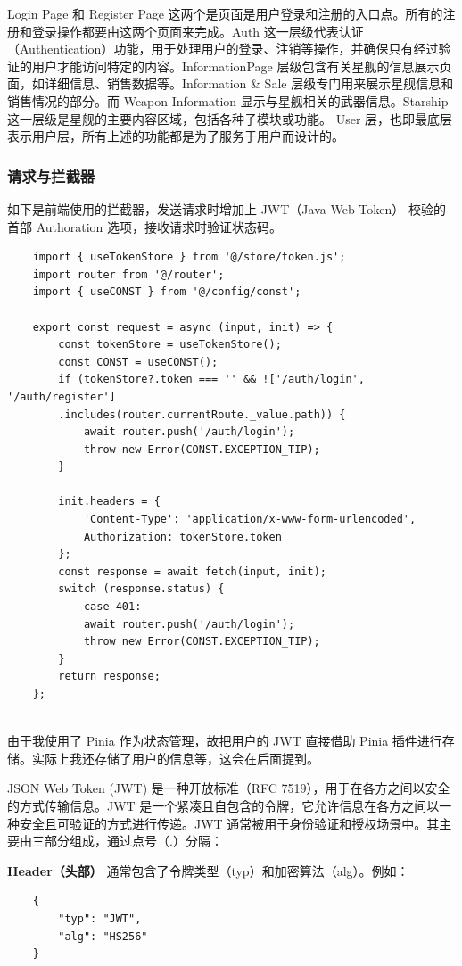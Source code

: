 \documentclass{base}
\begin{document}
Login Page 和 Register Page 这两个是页面是用户登录和注册的入口点。所有的注册和登录操作都要由这两个页面来完成。Auth 这一层级代表认证（Authentication）功能，用于处理用户的登录、注销等操作，并确保只有经过验证的用户才能访问特定的内容。InformationPage 层级包含有关星舰的信息展示页面，如详细信息、销售数据等。Information \& Sale 层级专门用来展示星舰信息和销售情况的部分。而 Weapon Information 显示与星舰相关的武器信息。Starship 这一层级是星舰的主要内容区域，包括各种子模块或功能。
User 层，也即最底层表示用户层，所有上述的功能都是为了服务于用户而设计的。

\subsubsection{请求与拦截器}

如下是前端使用的拦截器，发送请求时增加上 JWT（Java Web Token） 校验的首部 Authoration 选项，接收请求时验证状态码。

\begin{verbatim}
	import { useTokenStore } from '@/store/token.js';
	import router from '@/router';
	import { useCONST } from '@/config/const';
	
	export const request = async (input, init) => {
		const tokenStore = useTokenStore();
		const CONST = useCONST();
		if (tokenStore?.token === '' && !['/auth/login', '/auth/register']
		.includes(router.currentRoute._value.path)) {
			await router.push('/auth/login');
			throw new Error(CONST.EXCEPTION_TIP);
		}
		
		init.headers = {
			'Content-Type': 'application/x-www-form-urlencoded',
			Authorization: tokenStore.token
		};
		const response = await fetch(input, init);
		switch (response.status) {
			case 401:
			await router.push('/auth/login');
			throw new Error(CONST.EXCEPTION_TIP);
		}
		return response;
	};
	
\end{verbatim}

由于我使用了 Pinia 作为状态管理，故把用户的 JWT 直接借助 Pinia 插件进行存储。实际上我还存储了用户的信息等，这会在后面提到。

JSON Web Token (JWT) 是一种开放标准（RFC 7519），用于在各方之间以安全的方式传输信息。JWT 是一个紧凑且自包含的令牌，它允许信息在各方之间以一种安全且可验证的方式进行传递。JWT 通常被用于身份验证和授权场景中。其主要由三部分组成，通过点号（.）分隔：

\textbf{Header（头部）} 通常包含了令牌类型（typ）和加密算法（alg）。例如：

\begin{verbatim}
	{
		"typ": "JWT",
		"alg": "HS256"
	}
\end{verbatim}
\end{document}
